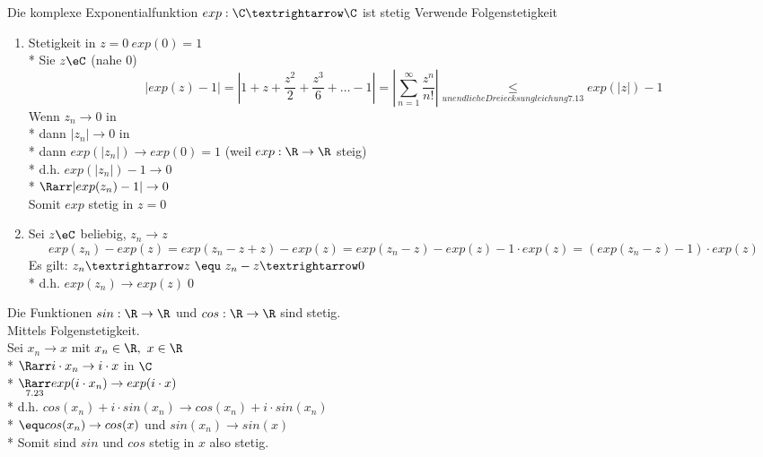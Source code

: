 Die komplexe Exponentialfunktion $exp:\C→\C$ ist stetig
\bew
Verwende Folgenstetigkeit
\begin{enumerate}
\item{Stetigkeit in $z=0\ exp (0)=1$\\*
Sie $z\eC$ (nahe 0)
$$\left|exp(z)-1\right|=\left|1+z+\frac{z^2}{2}+\frac{z^3}{6}+…-1\right|=\left|\sum_{n=1}^{∞}\frac{z^n}{n!}\right|\underset{unendliche Dreiecksungleichung 7.13}{\leq}exp(|z|)-1$$
Wenn $z_n→0$ in \C\\*
dann $|z_n|→0$ in \R\\*
dann $exp(|z_n|) \to exp(0) = 1$ (weil $exp: \R \to \R$ steig)\\*
d.h. $exp(|z_n|) -1 \to 0$\\*
$\Rarr|exp(z_n) - 1| \to 0$\\
Somit $exp$ stetig in $z = 0$ }
\item{Sei $z\eC$ beliebig, $z_n→z$
$$exp(z_n)-exp(z)=exp(z_n-z+z)-exp(z)=exp(z_n-z)-exp(z)-1·exp(z)=(exp(z_n-z)-1)·exp(z)$$
Es gilt: $z_n→z\ \equ\ z_n-z→0$\\*
d.h. $exp(z_n)→exp(z)$\qed}
\end{enumerate}

	Die Funktionen $sin: \R \to \R$ und $cos: \R \to \R$ sind stetig.\\
\bew
Mittels Folgenstetigkeit.\\
Sei $x_n \to x$ mit $x_n \in \R,\ x \in \R$\\*
$\Rarr i \cdot x_n \to i \cdot x$ in $\C$\\*
$\underset{{\footnotesize 7.23}}{\Rarr} exp(i \cdot x_n) \to exp(i \cdot x)$\\*
d.h. $cos(x_n) + i \cdot sin(x_n) \to cos(x_n) + i \cdot sin(x_n)$\\*
$\equ cos(x_n) \to cos(x)$ und $sin(x_n) \to sin(x)$\\*
Somit sind $sin$ und $cos$ stetig in $x$ also stetig.